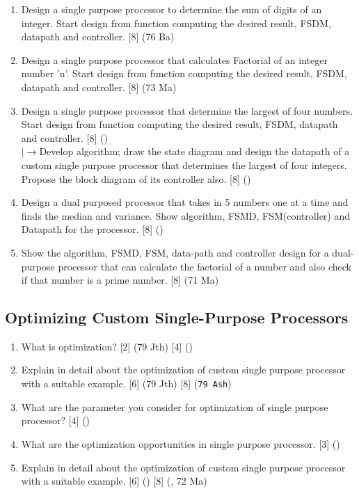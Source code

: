 \documentclass[12pt]{article}
\newcommand{\lb}{\\$\left|\rightarrow\right.$}
\begin{document}
\begin{enumerate}[topsep=0pt]
      \item Design a single purpose processor to determine the sum of digits of an integer. Start design from function computing the desired result, FSDM, datapath and controller. \hfill [8] (76 Ba)
      
      \item Design a single purpose processor that calculates Factorial of an integer number 'n'. Start design from function computing the desired result, FSDM, datapath and controller. \hfill [8] (73 Ma)
      
      \item Design a single purpose processor that determine the largest of four numbers. Start design from function computing the desired result, FSDM, datapath and controller. \hfill [8] ()
        \lb Develop algorithm; draw the state diagram and design the datapath of a custom single purpose processor that determines the largest of four integers. Propose the block diagram of its controller also. \hfill [8] ()
      
      \item Design a dual purposed processor that takes in 5 numbers one at a time and finds the median and variance. Show algorithm, FSMD, FSM(controller) and Datapath for the processor. \hfill [8] ()

      \item Show the algorithm, FSMD, FSM, data-path and controller design for a dual-purpose processor that can calculate the factorial of a number and also check if that number is a prime number. \hfill [8] (71 Ma)
    \end{enumerate}

  \subsection{Optimizing Custom Single-Purpose Processors}
    \begin{enumerate}[topsep=0pt, noitemsep]
      \item What is optimization? \hfill [2] (79 Jth) [4] ()

      \item Explain in detail about the optimization of custom single purpose processor with a suitable example. \hfill [6] (79 Jth) [8] (\texttt{79 Ash})
      
      \item What are the parameter you consider for optimization of single purpose processor? \hfill [4] () 

      \item What are the optimization opportunities in single purpose processor. \hfill [3] ()
      
      \item Explain in detail about the optimization of custom single purpose processor with a suitable example. \hfill [6] () [8] (, 72 Ma) 
    \end{enumerate}
\end{document}
